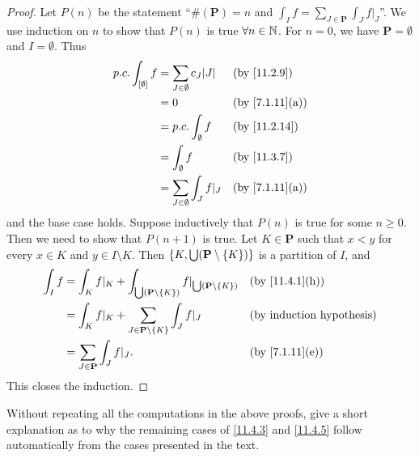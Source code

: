\begin{proof}
  Let \(P(n)\) be the statement ``\(\#(\mathbf{P}) = n\) and \(\int_I f = \sum_{J \in \mathbf{P}} \int_J f|_J\)''.
  We use induction on \(n\) to show that \(P(n)\) is true \(\forall n \in \mathbb{N}\).
  For \(n = 0\), we have \(\mathbf{P} = \emptyset\) and \(I = \emptyset\).
  Thus
  \begin{align*}
    p.c. \int_{[\emptyset]} f & = \sum_{J \in \emptyset} c_J \abs{J} &  & \by{11.2.9}                  \\
                              & = 0                                  &  & \text{(by \cref{7.1.11}(a))} \\
                              & = p.c. \int_{\emptyset} f            &  & \by{11.2.14}                 \\
                              & = \int_{\emptyset} f                 &  & \by{11.3.7}                  \\
                              & = \sum_{J \in \emptyset} \int_J f|_J &  & \text{(by \cref{7.1.11}(a))}
  \end{align*}
  and the base case holds.
  Suppose inductively that \(P(n)\) is true for some \(n \geq 0\).
  Then we need to show that \(P(n + 1)\) is true.
  Let \(K \in \mathbf{P}\) such that \(x < y\) for every \(x \in K\) and \(y \in I \setminus K\).
  Then \(\left\lbrace K, \bigcup (\mathbf{P} \setminus \left\lbrace K\right\rbrace)\right\rbrace\) is a partition of \(I\), and
  \begin{align*}
    \int_I f & = \int_K f|_K + \int_{\bigcup (\mathbf{P} \setminus \set{K})} f|_{\bigcup (\mathbf{P} \setminus \set{K})} &  & \text{(by \cref{11.4.1}(h))} \\
             & = \int_K f|_K + \sum_{J \in \mathbf{P} \setminus \set{K}} \int_J f|_J                                     &  & \byIH                        \\
             & = \sum_{J \in \mathbf{P}} \int_J f|_J.                                                                    &  & \text{(by \cref{7.1.11}(e))}
  \end{align*}
  This closes the induction.
\end{proof}

\begin{ex}\label{ex:11.4.4}
  Without repeating all the computations in the above proofs, give a short explanation as to why the remaining cases of \cref{11.4.3} and \cref{11.4.5} follow automatically from the cases presented in the text.
\end{ex}

